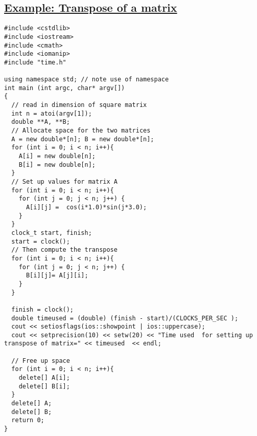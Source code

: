 \subsection*{\href{{https://github.com/CompPhysics/ComputationalPhysicsMSU/blob/master/doc/Programs/LecturePrograms/programs/Classes/cpp/program8.cpp}}{Example: Transpose of a matrix}}


















































\begin{Verbatim}[numbers=none,fontsize=\fontsize{9pt}{9pt},baselinestretch=0.95]
#include <cstdlib>
#include <iostream>
#include <cmath>
#include <iomanip>
#include "time.h"

using namespace std; // note use of namespace
int main (int argc, char* argv[])
{
  // read in dimension of square matrix
  int n = atoi(argv[1]);
  double **A, **B;
  // Allocate space for the two matrices
  A = new double*[n]; B = new double*[n];
  for (int i = 0; i < n; i++){
    A[i] = new double[n];
    B[i] = new double[n];
  }
  // Set up values for matrix A
  for (int i = 0; i < n; i++){
    for (int j = 0; j < n; j++) {
      A[i][j] =  cos(i*1.0)*sin(j*3.0);
    }
  }
  clock_t start, finish;
  start = clock();
  // Then compute the transpose
  for (int i = 0; i < n; i++){
    for (int j = 0; j < n; j++) {
      B[i][j]= A[j][i];
    }
  }

  finish = clock();
  double timeused = (double) (finish - start)/(CLOCKS_PER_SEC );
  cout << setiosflags(ios::showpoint | ios::uppercase);
  cout << setprecision(10) << setw(20) << "Time used  for setting up transpose of matrix=" << timeused  << endl;

  // Free up space
  for (int i = 0; i < n; i++){
    delete[] A[i];
    delete[] B[i];
  }
  delete[] A;
  delete[] B;
  return 0;
}


\end{Verbatim}


